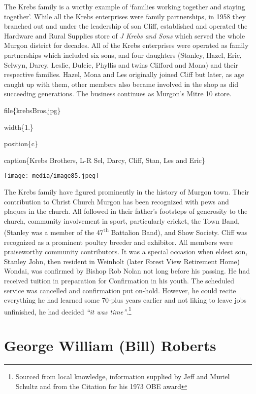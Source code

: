 The Krebs family is a worthy example of `families working together and staying together'. While all the Krebs enterprises were family partnerships, in 1958 they branched out and under the leadership of son Cliff, established and operated the Hardware and Rural Supplies store of \emph{J Krebs and Sons} which served the whole Murgon district for decades. All of the Krebs enterprises were operated as family partnerships which included six sons, and four daughters (Stanley, Hazel, Eric, Selwyn, Darcy, Leslie, Dulcie, Phyllis and twins Clifford and Mona) and their respective families. Hazel, Mona and Les originally joined Cliff but later, as age caught up with them, other members also became involved in the shop as did succeeding generations. The business continues as Murgon's Mitre 10 store.

file\{krebsBros.jpg\}

width\{1.\}

position\{c\}

caption\{Krebs Brothers, L-R Sel, Darcy, Cliff, Stan, Les and Eric\}

\texttt{[image: media/image85.jpeg]}

The Krebs family have figured prominently in the history of Murgon town. Their contribution to Christ Church Murgon has been recognized with pews and plaques in the church. All followed in their father's footsteps of generosity to the church, community involvement in sport, particularly cricket, the Town Band, (Stanley was a member of the 47\textsuperscript{th} Battalion Band), and Show Society. Cliff was recognized as a prominent poultry breeder and exhibitor. All members were praiseworthy community contributors. It was a special occasion when eldest son, Stanley John, then resident in Weinholt (later Forest View Retirement Home) Wondai, was confirmed by Bishop Rob Nolan not long before his passing. He had received tuition in preparation for Confirmation in his youth. The scheduled service was cancelled and confirmation put on-hold. However, he could recite everything he had learned some 70-plus years earlier and not liking to leave jobs unfinished, he had decided \emph{``it was time''}.\footnote{Sourced from local knowledge, information supplied by Jeff and Muriel Schultz and from the Citation for his 1973 OBE award}

\hypertarget{george-william-bill-roberts}{%
\section{George William (Bill) Roberts}\label{george-william-bill-roberts}}

